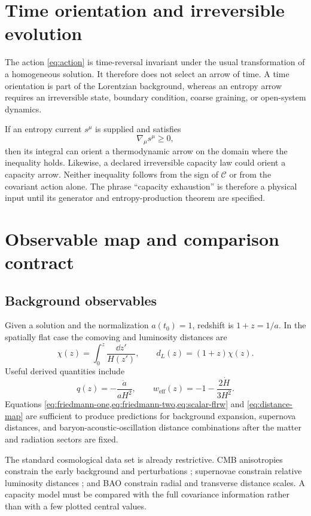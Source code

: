 \documentclass[11pt]{article}
\newcommand{\CC}{\mathcal C}
\begin{document}
\section{Time orientation and irreversible evolution}

The action \cref{eq:action} is time-reversal invariant under the usual
transformation of a homogeneous solution.  It therefore does not select
an arrow of time.  A time orientation is part of the Lorentzian
background, whereas an entropy arrow requires an irreversible state,
boundary condition, coarse graining, or open-system dynamics.

If an entropy current $s^\mu$ is supplied and satisfies
\[
 \nabla_\mu s^\mu\geq0,
\]
then its integral can orient a thermodynamic arrow on the domain where
the inequality holds.  Likewise, a declared irreversible capacity law
could orient a capacity arrow.  Neither inequality follows from the sign
of $\CC$ or from the covariant action alone.  The phrase ``capacity
exhaustion'' is therefore a physical input until its generator and
entropy-production theorem are specified.

\section{Observable map and comparison contract}

\subsection{Background observables}

Given a solution and the normalization $a(t_0)=1$, redshift is
$1+z=1/a$.  In the spatially flat case the comoving and luminosity
distances are
\begin{equation}
 \chi(z)=\int_0^z\frac{\dd z'}{H(z')},
 \qquad
 d_L(z)=(1+z)\chi(z).
 \label{eq:distance-map}
\end{equation}
Useful derived quantities include
\[
 q(z)=-\frac{\ddot a}{aH^2},
 \qquad
 w_{\mathrm{eff}}(z)
 =-1-\frac{2\dot H}{3H^2}.
\]
Equations \cref{eq:friedmann-one,eq:friedmann-two,eq:scalar-flrw} and
\cref{eq:distance-map} are sufficient to produce predictions for
background expansion, supernova distances, and baryon-acoustic-oscillation
distance combinations after the matter and radiation sectors are fixed.

The standard cosmological data set is already restrictive.  CMB
anisotropies constrain the early background and perturbations
\cite{planck_2018_parameters}; supernovae constrain relative luminosity
distances \cite{riess_1998,perlmutter_1999,brout_2022}; and BAO constrain
radial and transverse distance scales.  A capacity model must be compared
with the full covariance information rather than with a few plotted
central values.
\end{document}

